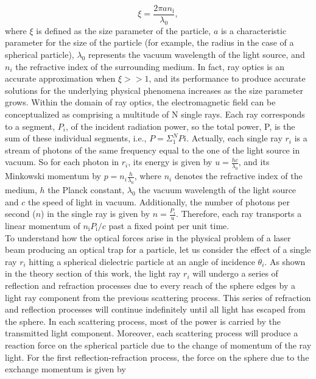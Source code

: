 \documentclass[letterpaper,12pt,oneside]{book}
\begin{document}
\begin{equation}
\xi=\frac{2 \pi a n_{\mathrm{i}}}{  \lambda_0},
\end{equation}
where $\xi$ is defined as the size parameter of the particle, $a$ is a characteristic parameter for the size of the particle (for example, the radius in the case of a spherical particle), $\lambda_0$ represents the vacuum wavelength of the light source, and $n_i$ the refractive index of the surrounding medium. In fact, ray optics is an accurate approximation when $\xi >> 1$, and its performance to produce accurate solutions for the underlying physical phenomena increases as the size parameter grows. Within the domain of ray optics, the electromagnetic field can be conceptualized as comprising a multitude of N single rays.  Each ray corresponds to a segment, $P_i$, of the incident radiation power, so the total power, P, is the sum of these individual segments, i.e., $P = \Sigma_1^N Pi$. Actually, each single ray $r_i$ is a stream of photons of the same frequency equal to the one of the light source in vacuum. So for each photon in $r_i$, its energy is given by $u= \frac{hc}{\lambda_0}$, and its Minkowski momentum by $p= n_i \frac{h}{\lambda_0}$, where $n_i$ denotes the refractive index of the medium, $h$ the Planck constant, $\lambda_0$ the vacuum wavelength of the light source and $c$ the speed of light in vacuum.
 Additionally, the number of photons per second ($n$) in the single ray is given by $ n = \frac{P_i}{u}$. Therefore, each ray transports a linear momentum of $n_{\mathrm{i}} P_{\mathrm{i}} / c$ past a fixed point per unit time.     \\ \noindent To understand how the optical forces arise in the physical problem of a laser beam producing an optical trap for a particle, let us consider the effect of a single ray $r_i $ hitting a spherical dielectric particle at an angle of incidence $\theta_i$. As shown in the theory section of this work, the light ray $r_i$ will undergo a series of reflection and refraction processes due to every reach of the sphere edges by a light ray component from the previous scattering process. This series of refraction and reflection processes will continue indefinitely until all light has escaped from the sphere. In each scattering process, most of the power is carried by the transmitted light component. Moreover, each scattering process will produce a reaction force on the spherical particle due to the change of momentum of the ray light. For the first reflection-refraction process, the force on the sphere due to the exchange momentum is given by 
\end{document}
